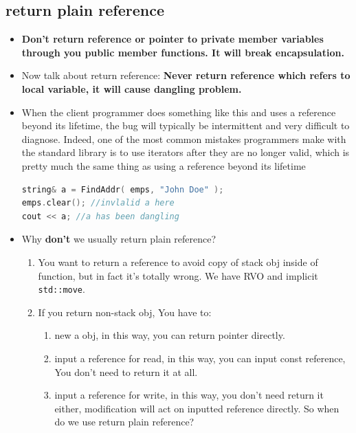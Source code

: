 \documentclass[a4paper,11pt,twoside]{book}
\begin{document}
\subsection{return plain reference} 
\begin{itemize}
	\item \textbf{Don't return reference or pointer to private member variables through you public member functions. It will break encapsulation. }
	
	\item Now talk about return reference: \textbf{Never return reference which refers to local variable, it will cause dangling problem.} 
	
	\item  When the client programmer does something like this and uses a reference beyond its lifetime, the bug will typically be intermittent and very difficult to diagnose. Indeed, one of the most common mistakes programmers make with the standard library is to use iterators after they are no longer valid, which is pretty much the same thing as using a reference beyond its lifetime
	
\begin{lstlisting}[frame=single, language=c++, mathescape=true]
string& a = FindAddr( emps, "John Doe" );
emps.clear(); //invlalid a here
cout << a; //a has been dangling  
\end{lstlisting}
	
	\item Why \textbf{don't} we usually return plain reference?
	\begin{enumerate}
	\item You want to return a reference to avoid copy of stack obj inside of function, but in fact it's totally wrong. We have RVO and implicit \texttt{std::move}.
	
	\item If you return non-stack obj, You have to:
		\begin{enumerate}
			\item new a obj, in this way, you can return pointer directly.
			\item input a reference for read, in this way, you can input const reference, You don't need to return it at all.
			\item input a reference for write, in this way, you don't need return it either, modification will act on inputted reference directly. So when do we use return plain reference?
		\end{enumerate}
	

\end{enumerate}
\end{itemize}
\end{document}
